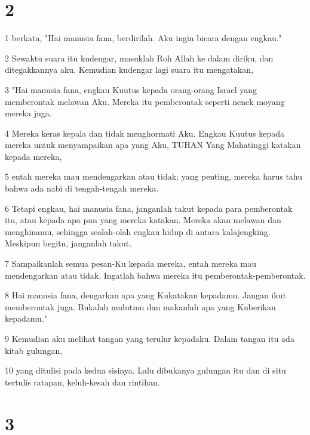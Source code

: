 \chapter{2}

\par 1 berkata, "Hai manusia fana, berdirilah. Aku ingin bicara dengan engkau."
\par 2 Sewaktu suara itu kudengar, masuklah Roh Allah ke dalam diriku, dan ditegakkannya aku. Kemudian kudengar lagi suara itu mengatakan,
\par 3 "Hai manusia fana, engkau Kuutus kepada orang-orang Israel yang memberontak melawan Aku. Mereka itu pemberontak seperti nenek moyang mereka juga.
\par 4 Mereka keras kepala dan tidak menghormati Aku. Engkau Kuutus kepada mereka untuk menyampaikan apa yang Aku, TUHAN Yang Mahatinggi katakan kepada mereka,
\par 5 entah mereka mau mendengarkan atau tidak; yang penting, mereka harus tahu bahwa ada nabi di tengah-tengah mereka.
\par 6 Tetapi engkau, hai manusia fana, janganlah takut kepada para pemberontak itu, atau kepada apa pun yang mereka katakan. Mereka akan melawan dan menghinamu, sehingga seolah-olah engkau hidup di antara kalajengking. Meskipun begitu, janganlah takut.
\par 7 Sampaikanlah semua pesan-Ku kepada mereka, entah mereka mau mendengarkan atau tidak. Ingatlah bahwa mereka itu pemberontak-pemberontak.
\par 8 Hai manusia fana, dengarkan apa yang Kukatakan kepadamu. Jangan ikut memberontak juga. Bukalah mulutmu dan makanlah apa yang Kuberikan kepadamu."
\par 9 Kemudian aku melihat tangan yang terulur kepadaku. Dalam tangan itu ada kitab gulungan,
\par 10 yang ditulisi pada kedua sisinya. Lalu dibukanya gulungan itu dan di situ tertulis ratapan, keluh-kesah dan rintihan.

\chapter{3}

